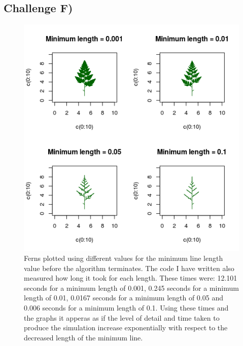 \documentclass[11pt]{article}
\begin{document}
\subsection*{Challenge F)}
\begin{figure}[H]
\begin{center}
\includegraphics[scale=1]{../Results/Plots/Challenge_F.png}
\caption{Ferns plotted using different values for the minimum line length value before the algorithm terminates. The code I have written also measured how long it took for each length. These times were: 12.101 seconds for a minimum length of 0.001, 0.245 seconds for a minimum length of 0.01, 0.0167 seconds for a minimum length of 0.05 and 0.006 seconds for a minimum length of 0.1. Using these times and the graphs it apperas as if the level of detail and time taken to produce the simulation increase exponentially with respect to the decreased length of the minimum line.  }
\end{center}

\end{figure}
\end{document}
